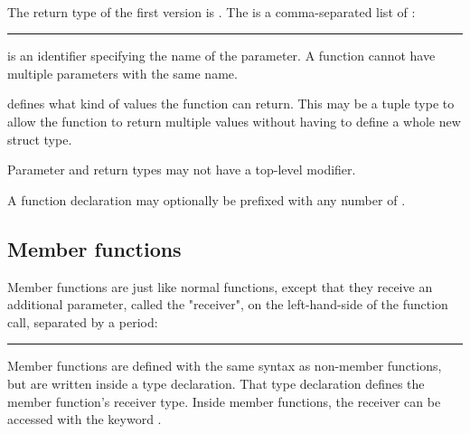 \begin{grammar}
  \code{(}  \code{)} \code{\{}  \code{\}}\\
  \code{(}  \code{)} \code{:}  \code{\{}  \code{\}}
\end{grammar}

The return type of the first version is . The
 is a comma-separated list of
:

\begin{grammar}
\rule{parameter}  \code{:} 
\end{grammar}

 is an identifier specifying the name of the
parameter. A function cannot have multiple parameters with the same name.

 defines what kind of values the function can return.
This may be a tuple type to allow the function to return multiple values without
having to define a whole new struct type.

Parameter and return types may not have a top-level  modifier.

A function declaration may optionally be prefixed with any number of
\hyperref[sec:function-specifiers]{}.

\subsection{Member functions}

Member functions are just like normal functions, except that they receive an
additional parameter, called the "receiver", on the left-hand-side of the
function call, separated by a period:

\begin{grammar}
\rule{member-function-call}    \code{(}  \code{)}
\end{grammar}

Member functions are defined with the same syntax as non-member functions, but
are written inside a type declaration. That type declaration defines the member
function's receiver type. Inside member functions, the receiver can be accessed
with the keyword .


